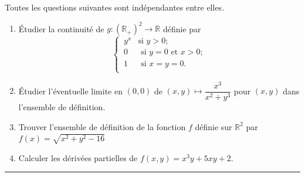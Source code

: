 \documentclass[a4paper,12pt]{article}
\begin{document}
Toutes les questions suivantes sont indépendantes entre elles.

  \begin{enumerate}
  \item
  Étudier la continuité de $g : (\mathbb R_+)^2 \longrightarrow \mathbb R$ définie par
\[
\begin{cases}
\, y^x &\text{si } y > 0 ;\\
\, 0 &\text{ si } y = 0 \text{ et } x > 0 ;\\
\,  1 &\text{ si } x = y = 0.\\
\end{cases}
\]
  \item Étudier l’éventuelle limite en $(0, 0)$ de $(x, y) \mapsto \dfrac{x^3}{x^2 + y^3}$ pour $(x, y)$ dans l'ensemble de définition.

  \item Trouver l'ensemble de définition de la fonction $f$ définie sur $\mathbb{R}^2$ par $f(x)=\sqrt{x^2+y^2-16}$

\item Calculer les dérivées partielles de $f(x,y)=x^3y+5xy+2$.

\end{enumerate}


\hfill\break
\hrule
\hfill\break
\end{document}
